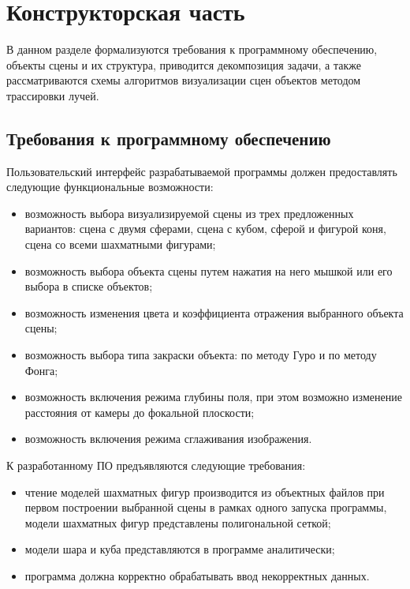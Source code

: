 \chapter{Конструкторская часть}
В данном разделе формализуются требования к программному обеспечению, объекты сцены и их структура, приводится декомпозиция задачи, а также рассматриваются схемы алгоритмов визуализации сцен объектов методом трассировки лучей.

\section{Требования к программному обеспечению}
Пользовательский интерфейс разрабатываемой программы должен предоставлять следующие функциональные возможности:
\begin{itemize}
	\item возможность выбора визуализируемой сцены из трех предложенных вариантов: сцена с двумя сферами, сцена с кубом, сферой и фигурой коня, сцена со всеми шахматными фигурами;
	\item возможность выбора объекта сцены путем нажатия на него мышкой или его выбора в списке объектов;
	\item возможность изменения цвета и коэффициента отражения выбранного объекта сцены;
	\item возможность выбора типа закраски объекта: по методу Гуро и по методу Фонга;
	\item возможность включения режима глубины поля, при этом возможно изменение расстояния от камеры до фокальной плоскости;
	\item возможность включения режима сглаживания изображения.
\end{itemize}

К разработанному ПО предъявляются следующие требования:
\begin{itemize}
	\item чтение моделей шахматных фигур производится из объектных файлов при первом построении выбранной сцены в рамках одного запуска программы, модели шахматных фигур представлены полигональной сеткой;
	\item модели шара и куба представляются в программе аналитически;
	\item программа должна корректно обрабатывать ввод некорректных данных.
\end{itemize}


